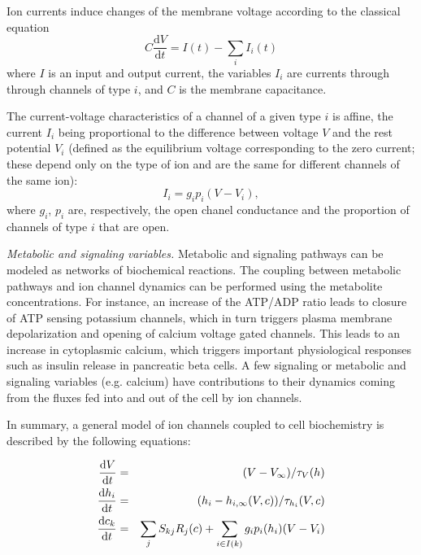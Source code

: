\documentclass{llncs}
\newcommand{\vect}[1]{\ensuremath{  #1 } }
\newcommand{\D}[2]{ \ensuremath{ \frac{\mathrm{d} #1 }{\mathrm{d} #2 } }}
\begin{document}
Ion currents induce changes of the membrane voltage according to the classical equation
\begin{equation}
C \D{V}{t} = I(t) - \sum_i I_i(t)
\end{equation}
where $I$ is an input  {and
output} current, the variables $I_i$ are currents through through channels of type $i$, and $C$ is the membrane capacitance.

The current-voltage characteristics of a channel of a given type $i$ is affine, the current $I_i$ being proportional
to the difference between voltage $V$ and the rest potential
$V_i$ (defined as the equilibrium voltage corresponding
to the zero current; these depend only on the type of ion and are
the same for different channels of the same ion):
\begin{equation}
I_i = g_i p_i (V - V_i),
\end{equation}
where $g_i$, $p_i$ are, respectively, the open chanel conductance and the proportion
of channels of type $i$ that are open.

{\em Metabolic and signaling variables.} Metabolic and signaling pathways can
be modeled as networks of biochemical reactions. The coupling between
metabolic pathways and ion channel dynamics can be performed  {using the metabolite
concentrations.} For instance,
an increase of the ATP/ADP ratio leads to closure of ATP sensing potassium
channels, which in turn triggers plasma membrane depolarization and opening of
calcium voltage gated channels. This leads to an increase in cytoplasmic
calcium, which triggers important physiological responses such as insulin
release in pancreatic beta cells. A few signaling or metabolic and signaling
variables (e.g. calcium) have contributions to their dynamics coming
from the fluxes fed into and out of the cell by ion channels.

In summary, a general model of ion channels coupled to cell biochemistry is described by
the following equations:

\begin{eqnarray}\label{intro:general_model}
\D{V}{t} &=&  (V - V_{\infty})/\tau_V (\vect{h}) \notag \\
\D{h_i}{t} &=& (h_i - h_{i,\infty}(V,\vect{c}))/\tau_{h_i}(V,c) \notag \\
\D{c_k}{t} &=& \sum_{j} S_{kj} R_j (\vect{c}) + \sum_{i \in I(k)} g_{i} p_{i}(h_{i}) (V-V_i) \label{full}
\end{eqnarray}
\end{document}
